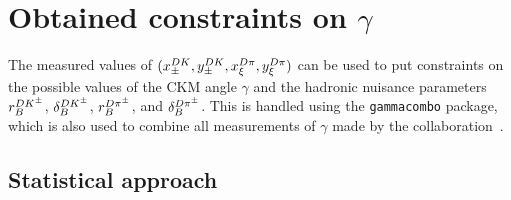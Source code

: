 
\section{\texorpdfstring{Obtained constraints on $\gamma$}{Obtained constraints on gamma}} %
\label{sec:constraints_on_gamma}

The measured values of $(x_\pm^{{D}{K}}, y_\pm^{{D}{K}}, x_\xi^{{D}\pi}, y_\xi^{{D}\pi})$ can be used to put constraints on the possible values of the CKM angle $\gamma$ and the hadronic nuisance parameters $r_B^{{{D}{{K}^\pm}}}$, $\delta_B^{{{D}{{K}^\pm}}}$, $r_B^{D\pi^\pm}$, and $\delta_B^{D\pi^\pm}$. This is handled using the \texttt{gammacombo} package, which is also used to combine all measurements of $\gamma$ made by the \lhcb collaboration~\cite{}.

\subsection{Statistical approach} %
\label{sub:statistical_approach}


